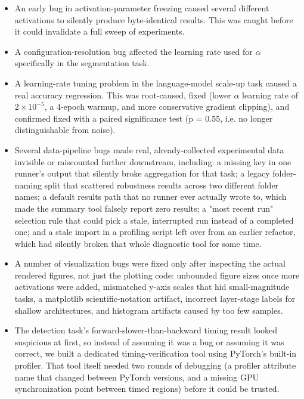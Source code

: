 \documentclass[conference]{IEEEtran}
\begin{document}
\begin{itemize}
\item An early bug in activation-parameter freezing caused several different activations to silently produce byte-identical results. This was caught before it could invalidate a full sweep of experiments.
\item A configuration-resolution bug affected the learning rate used for $\alpha$ specifically in the segmentation task.
\item A learning-rate tuning problem in the language-model scale-up task caused a real accuracy regression. This was root-caused, fixed (lower $\alpha$ learning rate of $2\times10^{-5}$, a 4-epoch warmup, and more conservative gradient clipping), and confirmed fixed with a paired significance test (p = 0.55, i.e. no longer distinguishable from noise).
\item Several data-pipeline bugs made real, already-collected experimental data invisible or miscounted further downstream, including: a missing key in one runner's output that silently broke aggregation for that task; a legacy folder-naming split that scattered robustness results across two different folder names; a default results path that no runner ever actually wrote to, which made the summary tool falsely report zero results; a "most recent run" selection rule that could pick a stale, interrupted run instead of a completed one; and a stale import in a profiling script left over from an earlier refactor, which had silently broken that whole diagnostic tool for some time.
\item A number of visualization bugs were fixed only after inspecting the actual rendered figures, not just the plotting code: unbounded figure sizes once more activations were added, mismatched y-axis scales that hid small-magnitude tasks, a matplotlib scientific-notation artifact, incorrect layer-stage labels for shallow architectures, and histogram artifacts caused by too few samples.
\item The detection task's forward-slower-than-backward timing result looked suspicious at first, so instead of assuming it was a bug or assuming it was correct, we built a dedicated timing-verification tool using PyTorch's built-in profiler. That tool itself needed two rounds of debugging (a profiler attribute name that changed between PyTorch versions, and a missing GPU synchronization point between timed regions) before it could be trusted.

\end{itemize}
\end{document}
